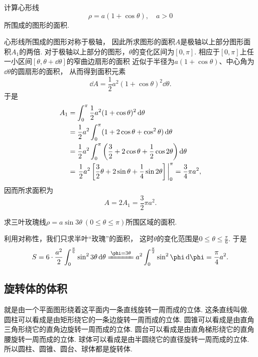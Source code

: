 \begin{example}
计算心形线\[
	\rho = a (1 + \cos\theta), \quad a>0
\]所围成的图形的面积.
\begin{solution}
心形线所围成的图形对称于极轴，
因此所求图形的面积\(A\)是极轴以上部分图形面积\(A_1\)的两倍.
对于极轴以上部分的图形，\(\theta\)的变化区间为\([0,\pi]\).
相应于\([0,\pi]\)上任一小区间\([\theta,\theta+\dd{\theta}]\)的窄曲边扇形的面积
近似于半径为\(a (1 + \cos\theta)\)、中心角为\(\dd{\theta}\)的圆扇形的面积，
从而得到面积元素\[
	\dd{A} = \frac12 a^2 (1 + \cos\theta)^2 \dd{\theta}.
\]
于是\begin{align*}
	A_1 &= \int_0^\pi \frac12 a^2 (1 + \cos\theta)^2 \dd{\theta} \\
	&= \frac12 a^2 \int_0^\pi (1 + 2\cos\theta + \cos^2\theta) \dd{\theta} \\
	&= \frac12 a^2 \int_0^\pi \left(\frac32 + 2 \cos\theta + \frac12 \cos2\theta\right) \dd{\theta} \\
	&= \eval{\frac12 a^2 \left[\frac32 \theta + 2 \sin\theta + \frac14 \sin2\theta\right]}_0^\pi
	= \frac34 \pi a^2,
\end{align*}
因而所求面积为\[
	A = 2 A_1 = \frac32 \pi a^2.
\]
\end{solution}
\end{example}

\begin{example}
求三叶玫瑰线\(\rho = a \sin3\theta\ (0 \leq \theta \leq \pi)\)所围区域的面积.
\begin{solution}
利用对称性，我们只求半叶“玫瑰”的面积，
这时\(\theta\)的变化范围是\(0 \leq \theta \leq \frac\pi6\).
于是\[
	S = 6 \cdot \frac{a^2}2 \int_0^{\frac\pi6} \sin^23\theta \dd{\theta}
	\xlongequal{\phi=3\theta} a^2 \int_0^{\frac\pi2} \sin^2\phi \dd{\phi}
	= \frac\pi4 a^2.
\]
\end{solution}
\end{example}

\subsection{旋转体的体积}
就是由一个平面图形绕着这平面内一条直线旋转一周而成的立体.
这条直线叫做.
圆柱可以看成是由矩形绕它的一条边旋转一周而成的立体.
圆锥可以看成是由直角三角形绕它的直角边旋转一周而成的立体.
圆台可以看成是由直角梯形绕它的直角腰旋转一周而成的立体.
球体可以看成是由半圆绕它的直径旋转一周而成的立体.
所以圆柱、圆锥、圆台、球体都是旋转体.

